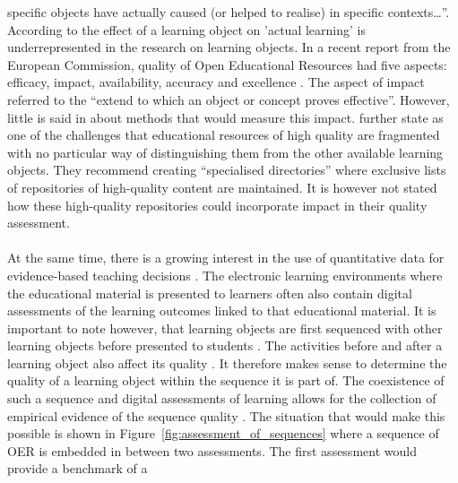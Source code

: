 specific objects have actually caused (or helped to realise) in specific
contexts\ldots''. According to \citep{Kay2007} the effect of a learning
object on 'actual learning' is underrepresented in the research on learning
objects. In a recent report from the European Commission, quality of Open
Educational Resources had five aspects: efficacy, impact, availability,
accuracy and excellence \citep{Camilleri2014}. The aspect of impact referred to
the ``extend to which an object or concept proves effective''. However, little is
said in \citet{Camilleri2014} about methods that would measure
this impact. \citeauthor{Camilleri2014} further state as one of the challenges
that educational resources of high quality are fragmented with no particular way of
distinguishing them from the other available learning objects. They recommend
creating ``specialised directories'' where exclusive lists of repositories of
high-quality content are maintained. It is however not stated how these
high-quality repositories could incorporate impact in their quality assessment.\\\\
\noindent
At the same time, there is a growing interest in the use of
quantitative data for evidence-based teaching decisions \citep{Wayman2005,
Marsh2006, Spillane2012, Clow2013}. The electronic learning environments where the
educational material is presented to learners often also contain
digital assessments of the learning outcomes linked to that educational
material. It is important to note however, that learning objects are
first sequenced with other learning objects before presented to students
\citep{Brusilovsky1992, Quinn2000}. The activities before and after a
learning object also affect its quality \citep{Duval2006}. It therefore makes
sense to determine the quality of a learning object within the sequence it is
part of. The coexistence of such a sequence and digital assessments of learning
allows for the collection of empirical evidence of the sequence quality
\citep{Latour2014}. The situation that would make this possible is shown in
Figure~\ref{fig:assessment_of_sequences} where a sequence of OER is embedded in
between two assessments. The first assessment would provide a benchmark of a
